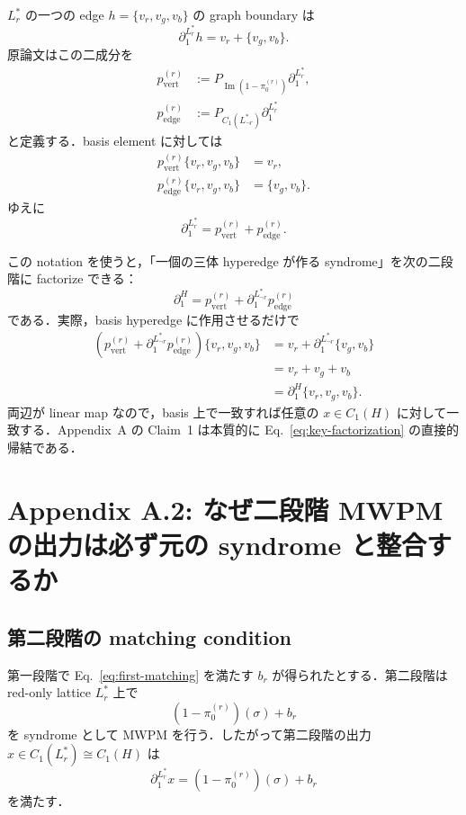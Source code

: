 \documentclass[a4paper,11pt]{ltjsarticle}
\newcommand{\bd}{\partial}
\newcommand{\im}{\operatorname{Im}}
\begin{document}
$L^*_r$ の一つの edge $h=\{v_r,v_g,v_b\}$ の graph boundary は
\begin{equation}
  \bd_1^{L^*_r}h = v_r+\{v_g,v_b\}.
\end{equation}
原論文はこの二成分を
\begin{align}
 p_{\mathrm{vert}}^{(r)}
 &:=P_{\im(1-\pi_0^{(r)})}\bd_1^{L^*_r},\\
 p_{\mathrm{edge}}^{(r)}
 &:=P_{C_1(L^*_{\neg r})}\bd_1^{L^*_r}
 \label{eq:p-maps}
\end{align}
と定義する．basis element に対しては
\begin{align}
 p_{\mathrm{vert}}^{(r)}\{v_r,v_g,v_b\}&=v_r,\\
 p_{\mathrm{edge}}^{(r)}\{v_r,v_g,v_b\}&=\{v_g,v_b\}.
 \label{eq:p-actions}
\end{align}
ゆえに
\begin{equation}
 \bd_1^{L^*_r}=p_{\mathrm{vert}}^{(r)}+p_{\mathrm{edge}}^{(r)}.
\end{equation}

この notation を使うと，「一個の三体 hyperedge が作る syndrome」を次の二段階に factorize できる：
\begin{equation}
 \boxed{
 \bd_1^H
 =p_{\mathrm{vert}}^{(r)}
 +\bd_1^{L^*_{\neg r}}p_{\mathrm{edge}}^{(r)}
 }
 \label{eq:key-factorization}
\end{equation}
である．実際，basis hyperedge に作用させるだけで
\begin{align}
 \left(p_{\mathrm{vert}}^{(r)}+\bd_1^{L^*_{\neg r}}p_{\mathrm{edge}}^{(r)}\right)
 \{v_r,v_g,v_b\}
 &=v_r+\bd_1^{L^*_{\neg r}}\{v_g,v_b\}\\
 &=v_r+v_g+v_b\\
 &=\bd_1^H\{v_r,v_g,v_b\}.
 \label{eq:basis-check}
\end{align}
両辺が linear map なので，basis 上で一致すれば任意の $x\in C_1(H)$ に対して一致する．Appendix~A の Claim~1 は本質的に Eq.~\eqref{eq:key-factorization} の直接的帰結である．

\section{Appendix A.2: なぜ二段階 MWPM の出力は必ず元の syndrome と整合するか}

\subsection{第二段階の matching condition}

第一段階で Eq.~\eqref{eq:first-matching} を満たす $b_r$ が得られたとする．第二段階は red-only lattice $L^*_r$ 上で
\begin{equation}
  (1-\pi_0^{(r)})(\sigma)+b_r
  \label{eq:second-syndrome}
\end{equation}
を syndrome として MWPM を行う．したがって第二段階の出力 $x\in C_1(L^*_r)\cong C_1(H)$ は
\begin{equation}
 \bd_1^{L^*_r}x=(1-\pi_0^{(r)})(\sigma)+b_r
 \label{eq:second-matching}
\end{equation}
を満たす．
\end{document}

